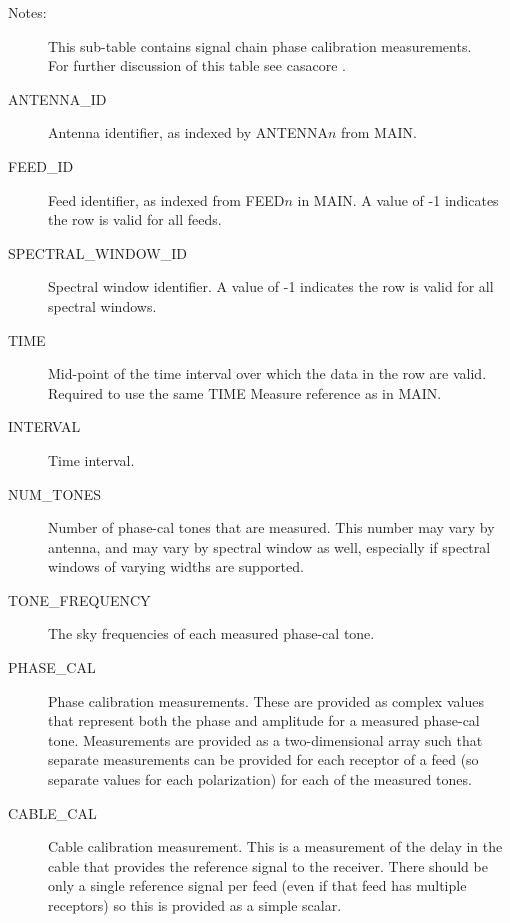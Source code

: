 \documentclass{article}
\begin{document}
\begin{description}

\item[Notes:] This sub-table contains signal chain phase calibration
  measurements.\\
  For further discussion of this table see casacore
  .

\item[ANTENNA\_ID] Antenna identifier, as indexed by ANTENNA$n$ from MAIN.

\item[FEED\_ID] Feed identifier, as indexed from FEED$n$ in MAIN. A
  value of -1 indicates the row is valid for all feeds.

\item[SPECTRAL\_WINDOW\_ID] Spectral window identifier. A value of -1
  indicates the row is valid for all spectral windows.

\item[TIME] Mid-point of the time interval over which the data in the
  row are valid. Required to use the same TIME Measure reference as in
  MAIN.

\item[INTERVAL] Time interval.

\item[NUM\_TONES] Number of phase-cal tones that are measured. This
  number may vary by antenna, and may vary by spectral window as well,
  especially if spectral windows of varying widths are supported.

\item[TONE\_FREQUENCY] The sky frequencies of each measured phase-cal tone.

\item[PHASE\_CAL] Phase calibration measurements. These are provided
  as complex values that represent both the phase and amplitude for a
  measured phase-cal tone. Measurements are provided as a
  two-dimensional array such that separate measurements can be
  provided for each receptor of a feed (so separate values for each
  polarization) for each of the measured tones.

\item[CABLE\_CAL] Cable calibration measurement. This is a measurement
  of the delay in the cable that provides the reference signal to the
  receiver. There should be only a single reference signal per feed
  (even if that feed has multiple receptors) so this is provided as a
  simple scalar.

\end{description}
\end{document}
